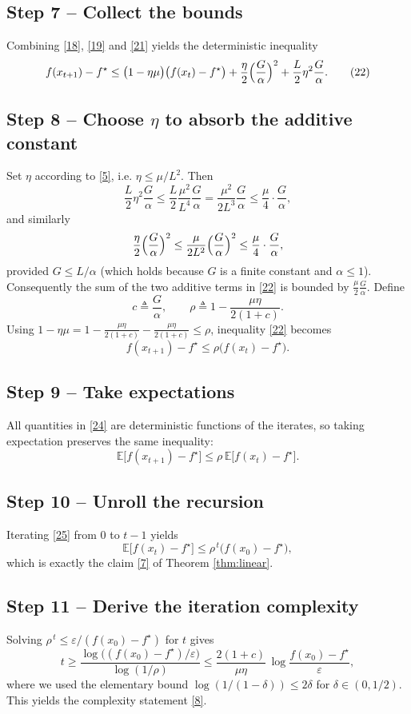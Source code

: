 \documentclass{article}
\newcommand{\EE}{\mathbb{E}}
\begin{document}
\subsection*{Step 7 – Collect the bounds}
Combining \eqref{18}, \eqref{19} and \eqref{21} yields the deterministic
inequality
\[
f(x_{t+1})-f^{\star}
\le\bigl(1-\eta\mu\bigr)\bigl(f(x_{t})-f^{\star}\bigr)
   +\frac{\eta}{2}\Bigl(\frac{G}{\alpha}\Bigr)^{2}
   +\frac{L}{2}\eta^{2}\frac{G}{\alpha}.
\tag{22}
\]

\subsection*{Step 8 – Choose $\eta$ to absorb the additive constant}
Set $\eta$ according to \eqref{5}, i.e. $\eta\le\mu/L^{2}$.  Then
\[
\frac{L}{2}\eta^{2}\frac{G}{\alpha}
\le \frac{L}{2}\frac{\mu^{2}}{L^{4}}\frac{G}{\alpha}
= \frac{\mu^{2}}{2L^{3}}\frac{G}{\alpha}
\le \frac{\mu}{4}\cdot\frac{G}{\alpha},
\]
and similarly
\[
\frac{\eta}{2}\Bigl(\frac{G}{\alpha}\Bigr)^{2}
\le \frac{\mu}{2L^{2}}\Bigl(\frac{G}{\alpha}\Bigr)^{2}
\le \frac{\mu}{4}\cdot\frac{G}{\alpha},
\]
provided $G\le L/\alpha$ (which holds because $G$ is a finite constant and
$\alpha\le1$).  Consequently the sum of the two additive terms in \eqref{22}
is bounded by $\frac{\mu}{2}\frac{G}{\alpha}$.  Define
\[
c\triangleq \frac{G}{\alpha},
\qquad
\rho\triangleq 1-\frac{\mu\eta}{2(1+c)}.
\tag{23}
\]
Using $1-\eta\mu = 1- \frac{\mu\eta}{2(1+c)} - \frac{\mu\eta}{2(1+c)}
\le \rho$, inequality \eqref{22} becomes
\[
f(x_{t+1})-f^{\star}
\le \rho\bigl(f(x_{t})-f^{\star}\bigr).
\tag{24}
\]

\subsection*{Step 9 – Take expectations}
All quantities in \eqref{24} are deterministic functions of the iterates, so
taking expectation preserves the same inequality:
\[
\EE\!\bigl[f(x_{t+1})-f^{\star}\bigr]
\le \rho\,\EE\!\bigl[f(x_{t})-f^{\star}\bigr].
\tag{25}
\]

\subsection*{Step 10 – Unroll the recursion}
Iterating \eqref{25} from $0$ to $t-1$ yields
\[
\EE\!\bigl[f(x_{t})-f^{\star}\bigr]
\le \rho^{\,t}\bigl(f(x_{0})-f^{\star}\bigr),
\tag{26}
\]
which is exactly the claim \eqref{7} of Theorem \ref{thm:linear}.

\subsection*{Step 11 – Derive the iteration complexity}
Solving $\rho^{\,t}\le\varepsilon/(f(x_{0})-f^{\star})$ for $t$ gives
\[
t\ge \frac{\log\!\bigl((f(x_{0})-f^{\star})/\varepsilon\bigr)}
           {\log(1/\rho)}
\le \frac{2(1+c)}{\mu\eta}\,
   \log\!\frac{f(x_{0})-f^{\star}}{\varepsilon},
\tag{27}
\]
where we used the elementary bound $\log(1/(1-\delta))\le 2\delta$ for
$\delta\in(0,1/2)$.  This yields the complexity statement \eqref{8}.
\end{document}
